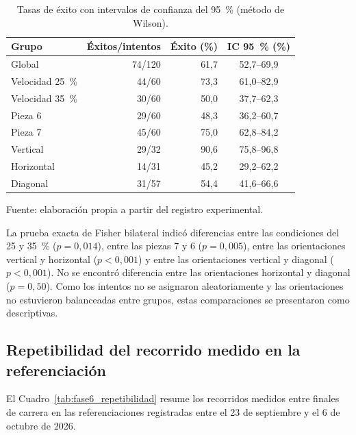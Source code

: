 \begin{table}[H]
    \centering
    \caption{Tasas de éxito con intervalos de confianza del 95~\% (método de Wilson).}
    \label{tab:fase6_intervalos}
    \begin{tabular}{l r r c}
        \hline
        Grupo & Éxitos/intentos & Éxito (\%) & IC 95~\% (\%) \\
        \hline
        Global & 74/120 & 61,7 & 52,7--69,9 \\
        Velocidad 25~\% & 44/60 & 73,3 & 61,0--82,9 \\
        Velocidad 35~\% & 30/60 & 50,0 & 37,7--62,3 \\
        Pieza 6 & 29/60 & 48,3 & 36,2--60,7 \\
        Pieza 7 & 45/60 & 75,0 & 62,8--84,2 \\
        Vertical & 29/32 & 90,6 & 75,8--96,8 \\
        Horizontal & 14/31 & 45,2 & 29,2--62,2 \\
        Diagonal & 31/57 & 54,4 & 41,6--66,6 \\
        \hline
    \end{tabular}
    \par\small\raggedright Fuente: elaboración propia a partir del registro experimental.
\end{table}

La prueba exacta de Fisher bilateral indicó diferencias entre las condiciones del 25 y 35~\% ($p=0{,}014$), entre las piezas 7 y 6 ($p=0{,}005$), entre las orientaciones vertical y horizontal ($p<0{,}001$) y entre las orientaciones vertical y diagonal ($p<0{,}001$). No se encontró diferencia entre las orientaciones horizontal y diagonal ($p=0{,}50$). Como los intentos no se asignaron aleatoriamente y las orientaciones no estuvieron balanceadas entre grupos, estas comparaciones se presentaron como descriptivas.

\subsection{Repetibilidad del recorrido medido en la referenciación}
\label{sec:resultados_repetibilidad}

El Cuadro~\ref{tab:fase6_repetibilidad} resume los recorridos medidos entre finales de carrera en las referenciaciones registradas entre el 23 de septiembre y el 6 de octubre de 2026.

